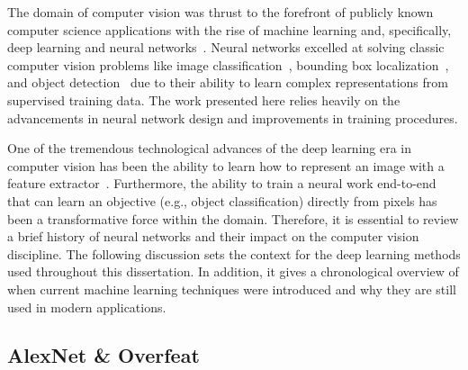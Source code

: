 The domain of computer vision was thrust to the forefront of publicly known computer science applications with the rise of machine learning and, specifically, deep learning and neural networks~\cite{poultney_efficient_2006,hinton_fast_2006,marlin_inductive_2010,salakhutdinov_deep_2009}.  Neural networks excelled at solving classic computer vision problems like image classification~\cite{krizhevsky_imagenet_2012,farabet_learning_2013,sermanet_overfeat:_2013, simonyan_very_2014, springenberg_striving_2014}, bounding box localization~\cite{sermanet_overfeat:_2013,erhan_scalable_2014, girshick_fast_2015,szegedy_going_2015}, and object detection~\cite{he_deep_2015,long_fully_2015,redmon_you_2016,ren_faster_2015} due to their ability to learn complex representations from supervised training data.  The work presented here relies heavily on the advancements in neural network design and improvements in training procedures.

One of the tremendous technological advances of the deep learning era in computer vision has been the ability to learn how to represent an image with a feature extractor~\cite{bergstra_quadratic_2009,sharif_razavian_cnn_2014}. Furthermore, the ability to train a neural work end-to-end that can learn an objective (e.g., object classification) directly from pixels has been a transformative force within the domain. Therefore, it is essential to review a brief history of neural networks and their impact on the computer vision discipline.  The following discussion sets the context for the deep learning methods used throughout this dissertation. In addition, it gives a chronological overview of when current machine learning techniques were introduced and why they are still used in modern applications.

\subsection{AlexNet \& Overfeat}

